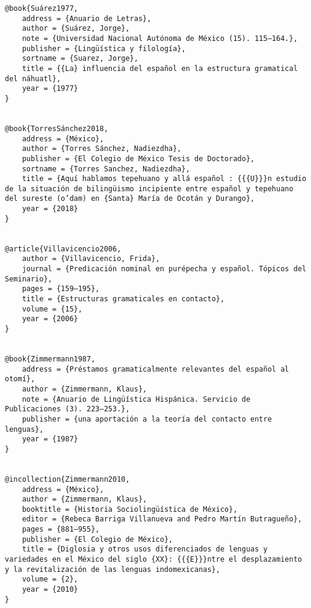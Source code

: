 \documentclass[output=paper]{../langscibook}
\begin{document}
\begin{verbatim}
@book{Suárez1977,
	address = {Anuario de Letras},
	author = {Suárez, Jorge},
	note = {Universidad Nacional Autónoma de México (15). 115–164.},
	publisher = {Lingüística y filología},
	sortname = {Suarez, Jorge},
	title = {{La} influencia del español en la estructura gramatical del náhuatl},
	year = {1977}
}


@book{TorresSánchez2018,
	address = {México},
	author = {Torres Sánchez, Nadiezdha},
	publisher = {El Colegio de México Tesis de Doctorado},
	sortname = {Torres Sanchez, Nadiezdha},
	title = {Aquí hablamos tepehuano y allá español : {{{U}}}n estudio de la situación de bilingüismo incipiente entre español y tepehuano del sureste (o’dam) en {Santa} María de Ocotán y Durango},
	year = {2018}
}


@article{Villavicencio2006,
	author = {Villavicencio, Frida},
	journal = {Predicación nominal en purépecha y español. Tópicos del Seminario},
	pages = {159–195},
	title = {Estructuras gramaticales en contacto},
	volume = {15},
	year = {2006}
}


@book{Zimmermann1987,
	address = {Préstamos gramaticalmente relevantes del español al otomí},
	author = {Zimmermann, Klaus},
	note = {Anuario de Lingüística Hispánica. Servicio de Publicaciones (3). 223–253.},
	publisher = {una aportación a la teoría del contacto entre lenguas},
	year = {1987}
}


@incollection{Zimmermann2010,
	address = {México},
	author = {Zimmermann, Klaus},
	booktitle = {Historia Sociolingüística de México},
	editor = {Rebeca Barriga Villanueva and Pedro Martín Butragueño},
	pages = {881–955},
	publisher = {El Colegio de México},
	title = {Diglosia y otros usos diferenciados de lenguas y variedades en el México del siglo {XX}: {{{E}}}ntre el desplazamiento y la revitalización de las lenguas indomexicanas},
	volume = {2},
	year = {2010}
}

\end{verbatim}
\sloppy\printbibliography[heading=subbibliography,notkeyword=this]
\end{document}
